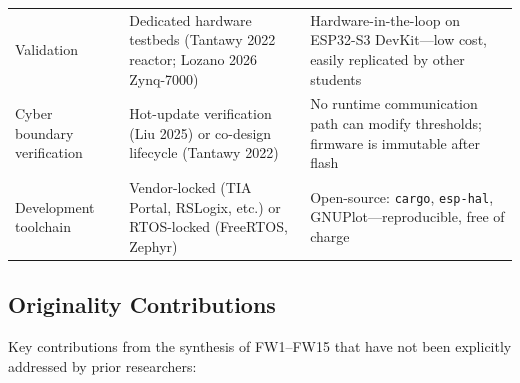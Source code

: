 \documentclass[11pt,a4paper]{article}
\begin{document}
\begin{longtable}{@{}p{4cm} p{5cm} p{5cm}@{}}
Validation & Dedicated hardware testbeds (Tantawy 2022 reactor; Lozano 2026 Zynq-7000) & Hardware-in-the-loop on ESP32-S3 DevKit---low cost, easily replicated by other students\\

Cyber boundary verification & Hot-update verification (Liu 2025) or co-design lifecycle (Tantawy 2022) & No runtime communication path can modify thresholds; firmware is immutable after flash\\

Development toolchain & Vendor-locked (TIA Portal, RSLogix, etc.) or RTOS-locked (FreeRTOS, Zephyr) & Open-source: \texttt{cargo}, \texttt{esp-hal}, GNUPlot---reproducible, free of charge\\

\end{longtable}

\subsection*{Originality Contributions}

Key contributions from the synthesis of FW1--FW15 that have not been explicitly addressed by prior researchers:
\end{document}
